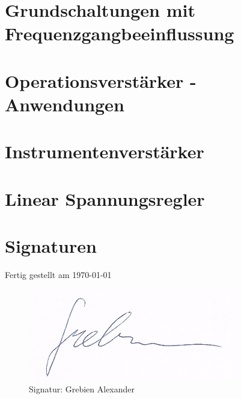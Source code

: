\chapter{Grundschaltungen mit Frequenzgangbeeinflussung}


\chapter{Operationsverstärker - Anwendungen}


\chapter{Instrumentenverstärker}


\chapter{Linear Spannungsregler}



\newpage
\chapter{Signaturen}
    Fertig gestellt am \today \\
    \begin{figure}[H]
        \centering
        \includegraphics{pics/signature_grebien.png}
    	\caption{Signatur: Grebien Alexander}
    	\label{pic:signatur_grebien}
    \end{figure}
        
\listoffigures
\listoftables


